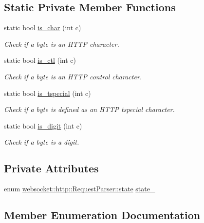 \subsection*{Static Private Member Functions}
\begin{DoxyCompactItemize}
\item 
static bool \hyperlink{classwebsocket_1_1http_1_1RequestParser_a3b64b2e4a7993ed710006539db861db9}{is\+\_\+char} (int c)
\begin{DoxyCompactList}\small\item\em Check if a byte is an H\+T\+TP character. \end{DoxyCompactList}\item 
static bool \hyperlink{classwebsocket_1_1http_1_1RequestParser_a7a75bf40bc4b9de6298e3e0e1d2860c2}{is\+\_\+ctl} (int c)
\begin{DoxyCompactList}\small\item\em Check if a byte is an H\+T\+TP control character. \end{DoxyCompactList}\item 
static bool \hyperlink{classwebsocket_1_1http_1_1RequestParser_aab25fc5fbe25d6eed0cc55e00ccb2fc3}{is\+\_\+tspecial} (int c)
\begin{DoxyCompactList}\small\item\em Check if a byte is defined as an H\+T\+TP tspecial character. \end{DoxyCompactList}\item 
static bool \hyperlink{classwebsocket_1_1http_1_1RequestParser_a8650b0f4d250cc7eba88666aa919b1f7}{is\+\_\+digit} (int c)
\begin{DoxyCompactList}\small\item\em Check if a byte is a digit. \end{DoxyCompactList}\end{DoxyCompactItemize}
\subsection*{Private Attributes}
\begin{DoxyCompactItemize}
\item 
enum \hyperlink{classwebsocket_1_1http_1_1RequestParser_af1ad2d57d234f4ac8fb9d9656bd9c8b2}{websocket\+::http\+::\+Request\+Parser\+::state} \hyperlink{classwebsocket_1_1http_1_1RequestParser_aed48589d041848aabcd27672a0a4ad73}{state\+\_\+}
\end{DoxyCompactItemize}


\subsection{Member Enumeration Documentation}
